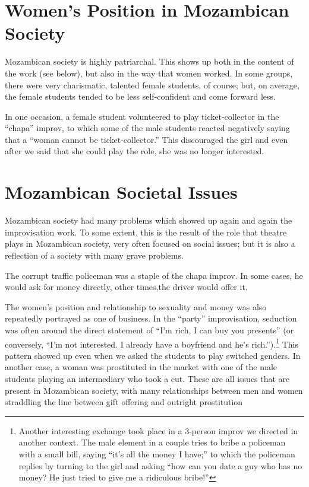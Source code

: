 \documentclass[article,twocolumn,twoside]{memoir}
\begin{document}
\section{Women's Position in Mozambican Society}

Mozambican society is highly patriarchal. This shows up both in the content
of the work (see below), but also in the way that women worked. In some groups,
there were very charismatic, talented female students, of course; but, on
average, the female students tended to be less self-confident and come forward
less.

In one occasion, a female student volunteered to play ticket-collector in the
``chapa'' improv, to which some of the male students reacted negatively saying
that a ``woman cannot be ticket-collector.'' This discouraged the girl and even
after we said that she could play the role, she was no longer interested.

\section{Mozambican Societal Issues}

Mozambican society had many problems which showed up again and again the
improvisation work. To some extent, this is the result of the role that theatre
plays in Mozambican society, very often focused on social issues; but it is
also a reflection of a society with many grave problems.

The corrupt traffic policeman was a staple of the chapa improv. In some cases,
he would ask for money directly, other times,the driver would offer it.

The women's position and relationship to sexuality and money was also
repeatedly portrayed as one of business. In the ``party'' improvisation,
seduction was often around the direct statement of ``I'm rich, I can buy you
presents'' (or conversely, ``I'm not interested. I already have a boyfriend and
he's rich.'').\footnote{Another interesting exchange took place in a 3-person
improv we directed in another context. The male element in a couple tries to
bribe a policeman with a small bill, saying ``it's all the money I have;'' to
which the policeman replies by turning to the girl and asking ``how can you
date a guy who has no money? He just tried to give me a ridiculous bribe!''}
This pattern showed up even when we asked the students to play switched
genders. In another case, a woman was prostituted in the market with one of the
male students playing an intermediary who took a cut. These are all issues that
are present in Mozambican society, with many relationships between men and
women straddling the line between gift offering and outright prostitution
\end{document}
